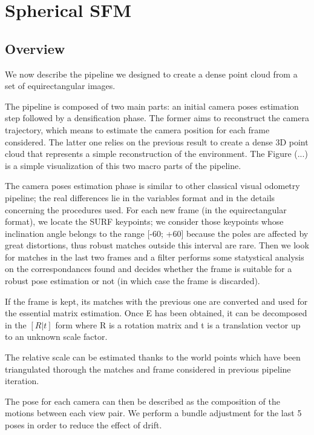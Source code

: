 \chapter{Spherical SFM}
\section{Overview}
We now describe the pipeline we designed to create a dense point cloud from 
a set of equirectangular images.

The pipeline is composed of two main parts: an initial camera poses estimation
step followed by a densification phase. The former aims to reconstruct the 
camera trajectory, which means to estimate the camera position for each frame 
considered. The latter one relies on the previous result to create a dense 
3D point cloud that represents a simple reconstruction of the environment.
The Figure (...)
is a simple visualization of this two macro parts of the 
pipeline.

The camera poses estimation phase is similar to other classical visual 
odometry pipeline; the real differences lie in the variables format and in 
the details concerning the procedures used. For each new frame 
(in the equirectangular format), we locate the
SURF keypoints; we consider those keypoints whose inclination angle belongs 
to the range [-60\degree; +60\degree] because the poles are affected by great 
distortions, thus robust matches outside this interval are rare.
Then we look for matches in the last two frames and a filter performs some 
statystical analysis on the correspondances found and decides whether the frame 
is suitable for a robust pose estimation or not (in which case the frame is 
discarded).

If the frame is kept, its matches with the previous one are converted
and used for the essential matrix estimation. Once E has been obtained, 
it can be decomposed in the \([R|t]\) form where R is a rotation matrix 
and t is a translation vector up to an unknown scale factor.

The relative scale can be estimated thanks to the world points which have been 
triangulated thorough the matches and frame considered in previous pipeline 
iteration.

The pose for each camera can then be described as the composition of the 
motions between each view pair. We perform a bundle adjustment for the last 5 
poses in order to reduce the effect of drift.

